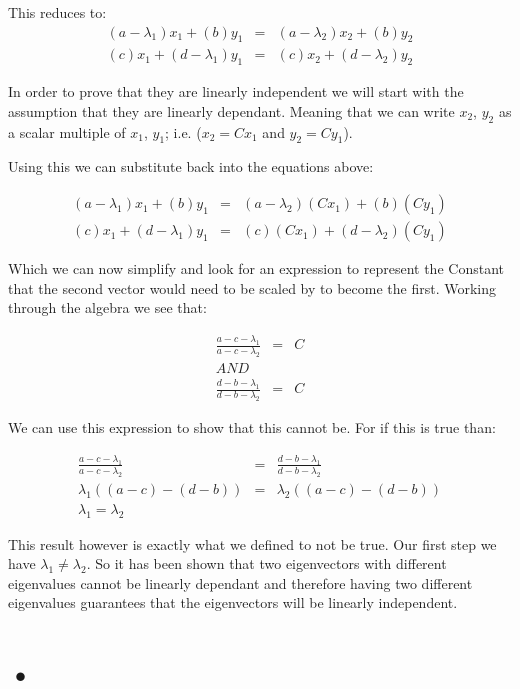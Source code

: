 \documentclass[12pt]{article}
\begin{document}
This reduces to:
\begin{eqnarray*}
(a-\lambda_1)x_1 + (b)y_1 &=& (a-\lambda_2)x_2 + (b)y_2\\
(c)x_1 + (d-\lambda_1)y_1 &=& (c) x_2 + (d-\lambda_2)y_2 
\end{eqnarray*}

In order to prove that they are linearly independent we will start with the assumption that they are linearly dependant. Meaning that we can write $x_2$, $y_2$ as a scalar multiple of $x_1$, $y_1$; i.e. ($x_2 = C x_1$ and $y_2 = C y_1$).

Using this we can substitute back into the equations above:

\begin{eqnarray*}
(a-\lambda_1)x_1 + (b)y_1 &=& (a-\lambda_2)(C x_1) + (b)(C y_1)\\
(c)x_1 + (d-\lambda_1)y_1 &=& (c) (C x_1) + (d-\lambda_2)(C y_1) 
\end{eqnarray*}

Which we can now simplify and look for an expression to represent the Constant that the second vector would need to be scaled by to become the first. Working through the algebra we see that:

\begin{eqnarray*}
\frac{a-c-\lambda_1}{a-c-\lambda_2} &=& C\\
AND\\
\frac{d-b-\lambda_1}{d-b-\lambda_2} &=& C
\end{eqnarray*}

We can use this expression to show that this cannot be. For if this is true than:

\begin{eqnarray*}
\frac{a-c-\lambda_1}{a-c-\lambda_2} &=& \frac{d-b-\lambda_1}{d-b-\lambda_2}\\
\lambda_1 ((a-c)-(d-b)) &=& \lambda_2 ((a-c)-(d-b))\\
\lambda_1 = \lambda_2
\end{eqnarray*}

This result however is exactly what we defined to not be true. Our first step we have $\lambda_1 \not = \lambda_2$. So it has been shown that two eigenvectors with different eigenvalues cannot be linearly dependant and therefore having two different eigenvalues guarantees that the eigenvectors will be linearly independent. 

\section{•}
\end{document}
